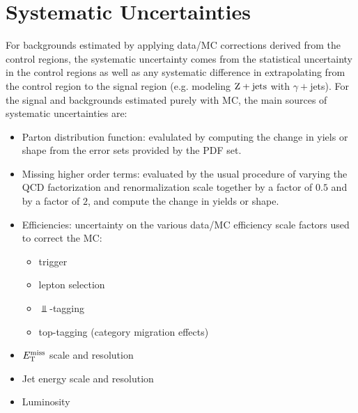 \section{Systematic Uncertainties}
\label{sec:systematics}

For backgrounds estimated by applying data/MC corrections derived from the control regions, the systematic uncertainty comes from the statistical uncertainty in the control regions as well as any systematic difference in extrapolating from the control region to the signal region (e.g. modeling $\mathrm{Z+jets}$ with $\gamma+$jets). For the signal and backgrounds estimated purely with MC, the main sources of systematic uncertainties are:

\begin{itemize}
\item Parton distribution function: evalulated by computing the change in yiels or shape from the error sets provided by the PDF set.
\item Missing higher order terms: evaluated by the usual procedure of varying the QCD factorization and renormalization scale together by a factor of $0.5$ and by a factor of $2$, and compute the change in yields or shape.
\item Efficiencies: uncertainty on the various data/MC efficiency scale factors used to correct the MC:
  \begin{itemize}
  \item trigger
  \item lepton selection
  \item $\Bot$-tagging
  \item top-tagging (category migration effects)
  \end{itemize}
\item $E_\mathrm{T}^{\mathrm{miss}}$ scale and resolution
\item Jet energy scale and resolution
\item Luminosity
\end{itemize}
